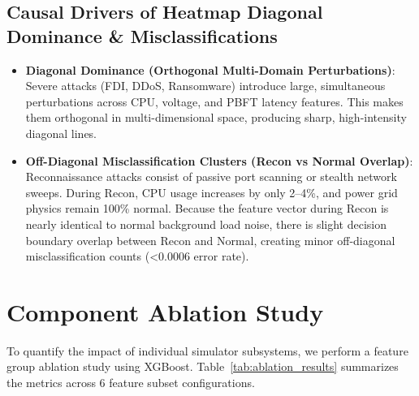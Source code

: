\documentclass[conference]{IEEEtran}
\begin{document}
\subsection{Causal Drivers of Heatmap Diagonal Dominance \& Misclassifications}
\label{subsec:cm_causes}
\begin{itemize}
    \item \textbf{Diagonal Dominance (Orthogonal Multi-Domain Perturbations)}: Severe attacks (FDI, DDoS, Ransomware) introduce large, simultaneous perturbations across CPU, voltage, and PBFT latency features. This makes them orthogonal in multi-dimensional space, producing sharp, high-intensity diagonal lines.
    
    \item \textbf{Off-Diagonal Misclassification Clusters (Recon vs Normal Overlap)}: Reconnaissance attacks consist of passive port scanning or stealth network sweeps. During Recon, CPU usage increases by only 2--4\%, and power grid physics remain 100\% normal. Because the feature vector during Recon is nearly identical to normal background load noise, there is slight decision boundary overlap between Recon and Normal, creating minor off-diagonal misclassification counts (<0.0006 error rate).
\end{itemize}

\section{Component Ablation Study}
\label{sec:ablation}

To quantify the impact of individual simulator subsystems, we perform a feature group ablation study using XGBoost. Table~\ref{tab:ablation_results} summarizes the metrics across 6 feature subset configurations.

\begin{table}[htbp]
\caption{Feature Group Ablation Study Results}
\label{tab:ablation_results}
\centering
{}
\end{table}
\end{document}
